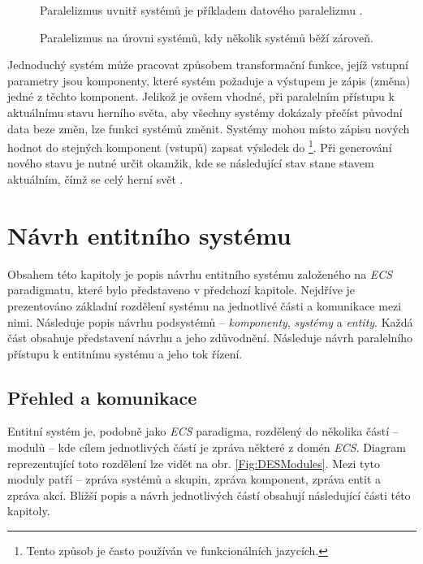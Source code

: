 \begin{figure}
	\caption{Paralelizmus uvnitř systémů je příkladem datového paralelizmu \cite{KindsOfParallelism}.}
	\label{Fig:PARData}
\end{figure}

\begin{figure}
	\caption{Paralelizmus na úrovni systémů, kdy několik systémů běží zároveň.}
	\label{Fig:PARSystem}
\end{figure}

Jednoduchý systém může pracovat způsobem transformační funkce, jejíž vstupní parametry jsou komponenty, které systém požaduje a výstupem je zápis (změna) jedné z těchto komponent. Jelikož je ovšem vhodné, při paralelním přístupu k aktuálnímu stavu herního světa, aby všechny systémy dokázaly přečíst původní data beze změn, lze funkci systémů změnit. Systémy mohou místo zápisu nových hodnot do stejných komponent (vstupů) zapsat výsledek do  \cite{FrontierThreads} \footnote{Tento způsob je často používán ve funkcionálních jazycích.}. Při generování nového stavu je nutné určit okamžik, kde se následující stav stane stavem aktuálním, čímž se celý herní svět .

\chapter{Návrh entitního systému}

Obsahem této kapitoly je popis návrhu entitního systému založeného na \emph{ECS} paradigmatu, které bylo představeno v předchozí kapitole. Nejdříve je prezentováno základní rozdělení systému na jednotlivé části a komunikace mezi nimi. Následuje popis návrhu podsystémů -- \emph{komponenty}, \emph{systémy} a \emph{entity}. Každá část obsahuje představení návrhu a jeho zdůvodnění. Následuje návrh paralelního přístupu k entitnímu systému a jeho tok řízení.

\section{Přehled a komunikace}

Entitní systém je, podobně jako \emph{ECS} paradigma, rozdělený do několika částí -- modulů -- kde cílem jednotlivých částí je zpráva některé z domén \emph{ECS}. Diagram reprezentující toto rozdělení lze vidět na obr. \ref{Fig:DESModules}. Mezi tyto moduly patří -- zpráva systémů a skupin, zpráva komponent, zpráva entit a zpráva akcí. Bližší popis a návrh jednotlivých částí obsahují následující části této kapitoly.

